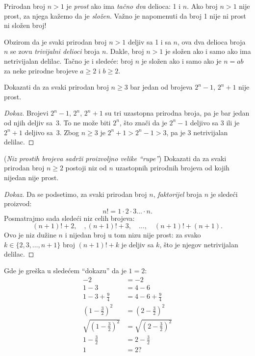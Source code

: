 Prirodan broj $n > 1$ je \emph{prost} ako ima \emph{ta\v cno dva} delioca: 1 i $n$.
Ako broj $n > 1$ nije prost, za njega ka\v zemo da je \emph{slo\v zen}.
Va\v zno je napomenuti da broj 1 nije ni prost ni slo\v zen broj!

Obzirom da je svaki prirodan broj $n > 1$ deljiv sa 1 i sa $n$, ova dva delioca broja $n$
se zovu \emph{trivijalni delioci} broja $n$. Dakle, broj $n > 1$ je slo\v zen ako i samo ako ima
netrivijalan delilac. Ta\v cno je i slede\'ce: broj $n$ je slo\v zen ako i samo ako je $n = ab$
za neke prirodne brojeve $a \ge 2$ i $b \ge 2$.

\begin{EX}
  Dokazati da za svaki prirodan broj $n \ge 3$ bar jedan od brojeva $2^n - 1$, $2^n + 1$ nije prost.
\end{EX}
\begin{proof}[Dokaz]
  Brojevi $2^n - 1$, $2^n$, $2^n + 1$ su tri uzastopna prirodna broja, pa je bar jedan od njih deljiv sa~3.
  To ne mo\v ze biti $2^n$, \v sto zna\v ci da je $2^n - 1$ deljivo sa 3 ili je $2^n + 1$ deljivo sa~3.
  Zbog $n \ge 3$ je $2^n + 1 > 2^n - 1 > 3$, pa je 3 netrivijalan delilac.
\end{proof}

\begin{EX} (\emph{Niz prostih brojeva sadr\v zi proizvoljno velike ``rupe''})
  Dokazati da za svaki prirodan broj $n \ge 2$ postoji niz od $n$ uzastopnih
  prirodnih brojeva od kojih nijedan nije prost.
\end{EX}
\begin{proof}[Dokaz]
  Da se podsetimo, za svaki prirodan broj $n$, \emph{faktorijel} broja $n$ je slede\'ci proizvod:
  $$
    n! = 1 \cdot 2 \cdot 3 \ldots \cdot n.
  $$
  Posmatrajmo sada slede\'ci niz celih brojeva:
  $$
    (n + 1)! + 2, \quad, (n + 1)! + 3, \quad \ldots, \quad (n+1)! + (n+1).
  $$
  Ovo je niz du\v zine $n$ i nijedan broj u tom nizu nije prost: za svako $k \in \{2, 3, \ldots, n+1\}$
  broj $(n + 1)! + k$ je deljiv sa $k$, \v sto je njegov netrivijalan delilac.
\end{proof}

\begin{EX}
  Gde je gre\v ska u slede\'cem ``dokazu'' da je $1 = 2$:
  \begin{align*}
    -2 &= -2 \\
    1 - 3 &= 4 - 6 \\
    1 - 3 + \frac 94 &= 4 - 6 + \frac 94 \\
    \left(1 - \frac 32\right)^2 &= \left(2 - \frac 32\right)^2 \\
    \sqrt{\left(1 - \frac 32\right)^2} &= \sqrt{\left(2 - \frac 32\right)^2} \\
    1 - \frac 32 &= 2 - \frac 32 \\
    1 &= 2 ?
  \end{align*}
\end{EX}

